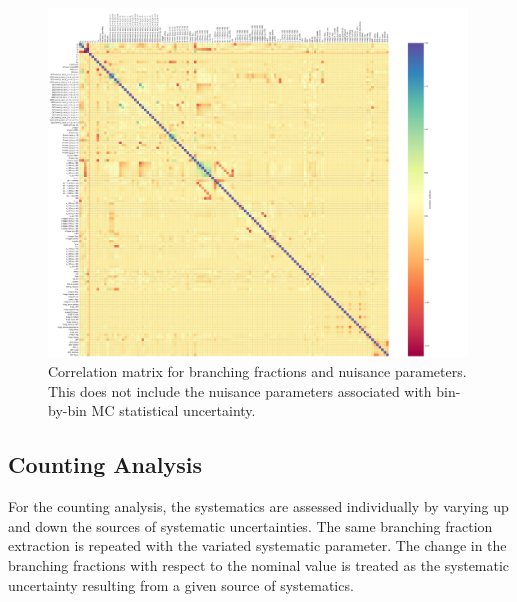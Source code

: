\begin{figure}[ht]
    \centering
    \includegraphics[width=0.99\textwidth]{chapters/Analysis/sectionSystematics/figures/correlation_matrix_full.pdf}
    \caption{Correlation matrix for branching fractions and nuisance
        parameters.  This does not include the nuisance parameters
        associated with bin-by-bin MC statistical uncertainty.}
    \label{fig:analysis:systematics:corr_matrix}
\end{figure}


\FloatBarrier



\subsection{Counting Analysis}

For the counting analysis, the systematics are assessed individually by varying up and down the sources of systematic uncertainties. The same branching fraction extraction is repeated with the variated systematic parameter. The change in the branching fractions with respect to the nominal value is treated as the systematic uncertainty resulting from a given source of systematics.

